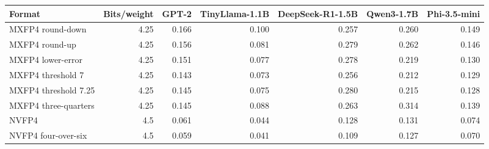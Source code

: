 \begin{tabular}{lrrrrrr}
\toprule
Format & Bits/weight & GPT-2 & TinyLlama-1.1B & DeepSeek-R1-1.5B & Qwen3-1.7B & Phi-3.5-mini \\
\midrule
MXFP4 round-down & 4.25 & 0.166 & 0.100 & 0.257 & 0.260 & 0.149 \\
MXFP4 round-up & 4.25 & 0.156 & 0.081 & 0.279 & 0.262 & 0.146 \\
MXFP4 lower-error & 4.25 & 0.151 & 0.077 & 0.278 & 0.219 & 0.130 \\
MXFP4 threshold 7 & 4.25 & 0.143 & 0.073 & 0.256 & 0.212 & 0.129 \\
MXFP4 threshold 7.25 & 4.25 & 0.145 & 0.075 & 0.280 & 0.215 & 0.128 \\
MXFP4 three-quarters & 4.25 & 0.145 & 0.088 & 0.263 & 0.314 & 0.139 \\
NVFP4 & 4.5 & 0.061 & 0.044 & 0.128 & 0.131 & 0.074 \\
NVFP4 four-over-six & 4.5 & 0.059 & 0.041 & 0.109 & 0.127 & 0.070 \\
\bottomrule
\end{tabular}
